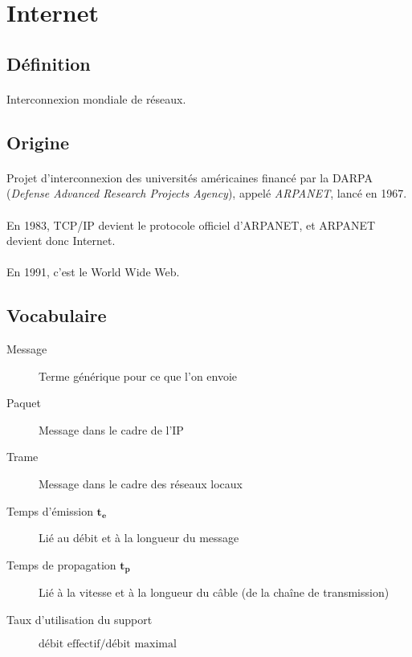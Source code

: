 \documentclass{article}
\begin{document}
\section{Internet}

\subsection{Définition}

\paragraph{}
Interconnexion mondiale de réseaux.

\subsection{Origine}

\paragraph{}
Projet d'interconnexion des universités américaines financé par la DARPA (\emph{Defense Advanced Research Projects Agency}), appelé \emph{ARPANET}, lancé en 1967.

\paragraph{}
En 1983, TCP/IP devient le protocole officiel d'ARPANET, et ARPANET devient donc Internet.

\paragraph{}
En 1991, c'est le World Wide Web.

\subsection{Vocabulaire}

\begin{description}
	\item[Message] Terme générique pour ce que l'on envoie
	\item[Paquet] Message dans le cadre de l'IP
	\item[Trame] Message dans le cadre des réseaux locaux
	\item[Temps d'émission $\boldsymbol{t_e}$] Lié au débit et à la longueur du message
	\item[Temps de propagation $\boldsymbol{t_p}$] Lié à la vitesse et à la longueur du câble (de la chaîne de transmission)
	\item[Taux d'utilisation du support]  $\text{débit effectif}/\text{débit maximal}$
\end{description}
\end{document}
